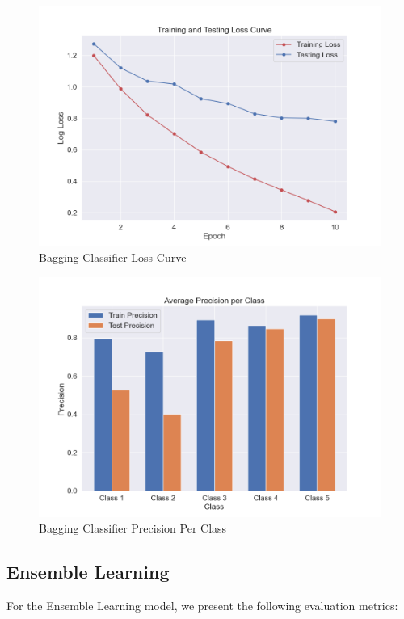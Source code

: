 \begin{figure}[H]
	\centering
	\includegraphics[width=\textwidth]{img/paper_1/loss_curve.png}
	\caption{Bagging Classifier Loss Curve}
\end{figure}

\begin{figure}[H]
	\centering
	\includegraphics[width=\textwidth]{img/paper_1/precision_per_class.png}
	\caption{Bagging Classifier Precision Per Class}
\end{figure}

\subsection{Ensemble Learning}

For the Ensemble Learning model, we present the following evaluation metrics:

